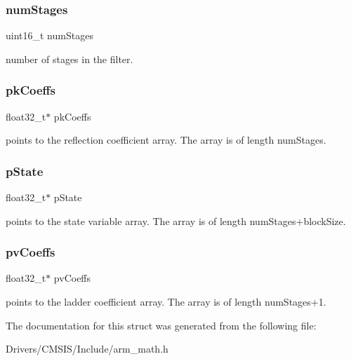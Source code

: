 \subsubsection{\texorpdfstring{num\+Stages}{numStages}}
{\footnotesize\ttfamily uint16\+\_\+t num\+Stages}

number of stages in the filter. \mbox{\label{structarm__iir__lattice__instance__f32_a994889c5c4a866c50a0ee63326378816}} 
\subsubsection{\texorpdfstring{pk\+Coeffs}{pkCoeffs}}
{\footnotesize\ttfamily float32\+\_\+t$\ast$ pk\+Coeffs}

points to the reflection coefficient array. The array is of length num\+Stages. \mbox{\label{structarm__iir__lattice__instance__f32_a335c87e6fdc4b96601d95a5de8b9c463}} 
\subsubsection{\texorpdfstring{p\+State}{pState}}
{\footnotesize\ttfamily float32\+\_\+t$\ast$ p\+State}

points to the state variable array. The array is of length num\+Stages+block\+Size. \mbox{\label{structarm__iir__lattice__instance__f32_a0f8815744fade9c580d44277ff802308}} 
\subsubsection{\texorpdfstring{pv\+Coeffs}{pvCoeffs}}
{\footnotesize\ttfamily float32\+\_\+t$\ast$ pv\+Coeffs}

points to the ladder coefficient array. The array is of length num\+Stages+1. 

The documentation for this struct was generated from the following file\+:\begin{DoxyCompactItemize}
\item 
Drivers/\+C\+M\+S\+I\+S/\+Include/arm\+\_\+math.\+h\end{DoxyCompactItemize}

